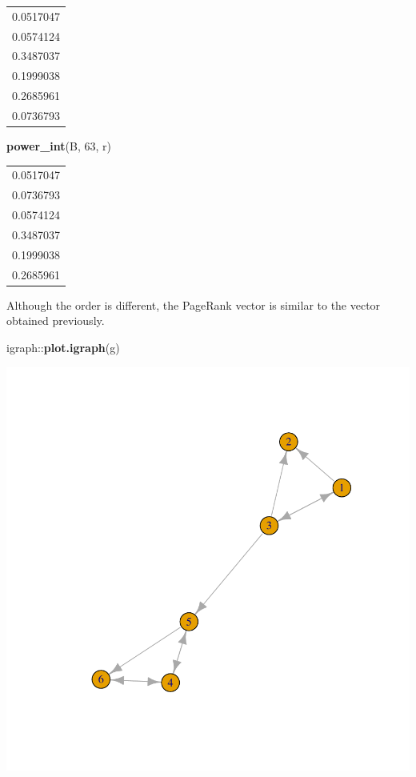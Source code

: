 \documentclass[]{article}
\newenvironment{Shaded}{\begin{snugshade}}{\end{snugshade}}
\newcommand{\KeywordTok}[1]{\textcolor[rgb]{0.13,0.29,0.53}{\textbf{{#1}}}}
\newcommand{\DecValTok}[1]{\textcolor[rgb]{0.00,0.00,0.81}{{#1}}}
\newcommand{\NormalTok}[1]{{#1}}
\begin{document}
\begin{longtable}[]{@{}r@{}}
\toprule
0.0517047\tabularnewline
0.0574124\tabularnewline
0.3487037\tabularnewline
0.1999038\tabularnewline
0.2685961\tabularnewline
0.0736793\tabularnewline
\bottomrule
\end{longtable}

\begin{Shaded}
\begin{Highlighting}[]
\KeywordTok{power_int}\NormalTok{(B, }\DecValTok{63}\NormalTok{, r)}
\end{Highlighting}
\end{Shaded}

\begin{longtable}[]{@{}r@{}}
\toprule
0.0517047\tabularnewline
0.0736793\tabularnewline
0.0574124\tabularnewline
0.3487037\tabularnewline
0.1999038\tabularnewline
0.2685961\tabularnewline
\bottomrule
\end{longtable}

Although the order is different, the PageRank vector is similar to the
vector obtained previously.

\newpage

\begin{Shaded}
\begin{Highlighting}[]
\NormalTok{igraph::}\KeywordTok{plot.igraph}\NormalTok{(g)}
\end{Highlighting}
\end{Shaded}

\includegraphics{CHunt_Assign10_PS1_files/figure-latex/unnamed-chunk-13-1.pdf}
\end{document}
